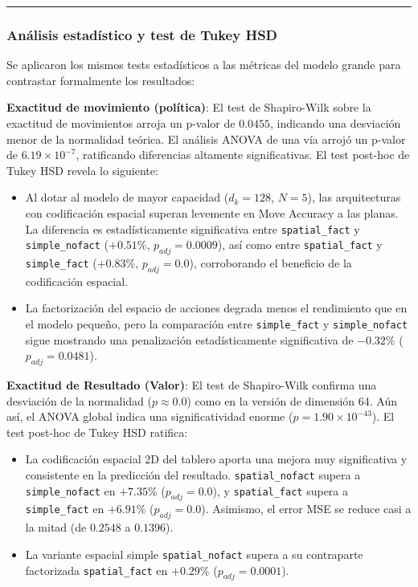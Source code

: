 \documentclass[12pt, a4paper]{article}
\begin{document}
\begin{table}[htbp]
    \caption[Métricas de test para el modelo grande]{Rendimiento medio y desviación estándar de las métricas en test para el modelo grande \texttt{Transformer dk128\_n5} (8 semillas $\times$ 4 variantes).}
    \label{tab:resultados_test_ablation_dk128}
\end{table}

\rule{\textwidth}{0.2pt}
\subsubsection{Análisis estadístico y test de Tukey HSD}

Se aplicaron los mismos tests estadísticos a las métricas del modelo grande para contrastar formalmente los resultados:

\textbf{Exactitud de movimiento (política)}: El test de Shapiro-Wilk sobre la exactitud de movimientos arroja un p-valor de $0.0455$, indicando una desviación menor de la normalidad teórica. El análisis ANOVA de una vía arrojó un p-valor de $6.19 \times 10^{-7}$, ratificando diferencias altamente significativas. El test post-hoc de Tukey HSD revela lo siguiente:
\begin{itemize}
    \item Al dotar al modelo de mayor capacidad ($d_k=128$, $N=5$), las arquitecturas con codificación espacial superan levemente en Move Accuracy a las planas. La diferencia es estadísticamente significativa entre \texttt{spatial\_fact} y \texttt{simple\_nofact} ($+0.51\%$, $p_{adj} = 0.0009$), así como entre \texttt{spatial\_fact} y \texttt{simple\_fact} ($+0.83\%$, $p_{adj} = 0.0$), corroborando el beneficio de la codificación espacial.
    \item La factorización del espacio de acciones degrada menos el rendimiento que en el modelo pequeño, pero la comparación entre \texttt{simple\_fact} y \texttt{simple\_nofact} sigue mostrando una penalización estadísticamente significativa de $-0.32\%$ ($p_{adj} = 0.0481$).
\end{itemize}

\textbf{Exactitud de Resultado (Valor)}: El test de Shapiro-Wilk confirma una desviación de la normalidad ($p \approx 0.0$) como en la versión de dimensión 64. Aún así, el ANOVA global indica una significatividad enorme ($p = 1.90 \times 10^{-43}$). El test post-hoc de Tukey HSD ratifica:
\begin{itemize}
    \item La codificación espacial 2D del tablero aporta una mejora muy significativa y consistente en la predicción del resultado. \texttt{spatial\_nofact} supera a \texttt{simple\_nofact} en $+7.35\%$ ($p_{adj} = 0.0$), y \texttt{spatial\_fact} supera a \texttt{simple\_fact} en $+6.91\%$ ($p_{adj} = 0.0$). Asimismo, el error MSE se reduce casi a la mitad (de $0.2548$ a $0.1396$).
    \item La variante espacial simple \texttt{spatial\_nofact} supera a su contraparte factorizada \texttt{spatial\_fact} en $+0.29\%$ ($p_{adj} = 0.0001$).
\end{itemize}
\end{document}
